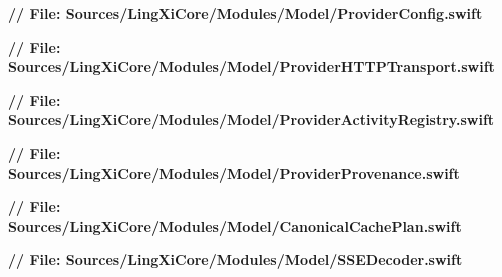\documentclass[10pt,a4paper]{article}
\newcommand{\repoRoot}{../../../}
\begin{document}
\noindent\textbf{// File: Sources/LingXiCore/Modules/Model/ProviderConfig.swift}\par\vspace{2pt}

\vspace{8pt}

\noindent\textbf{// File: Sources/LingXiCore/Modules/Model/ProviderHTTPTransport.swift}\par\vspace{2pt}

\vspace{8pt}

\noindent\textbf{// File: Sources/LingXiCore/Modules/Model/ProviderActivityRegistry.swift}\par\vspace{2pt}

\vspace{8pt}

\noindent\textbf{// File: Sources/LingXiCore/Modules/Model/ProviderProvenance.swift}\par\vspace{2pt}

\vspace{8pt}

\noindent\textbf{// File: Sources/LingXiCore/Modules/Model/CanonicalCachePlan.swift}\par\vspace{2pt}

\vspace{8pt}

\noindent\textbf{// File: Sources/LingXiCore/Modules/Model/SSEDecoder.swift}\par\vspace{2pt}

\vspace{8pt}
\end{document}
